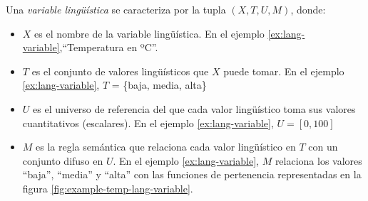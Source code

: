 \begin{definition}\label{def:formal-lang-variable}
\normalfont
Una \emph{variable lingüística} se caracteriza por la tupla $(X,T,U,M)$, donde:
\begin{itemize}
  \item $X$ es el nombre de la variable lingüística. En el ejemplo \ref{ex:lang-variable},``Temperatura en ºC''.
  \item $T$ es el conjunto de valores lingüísticos que $X$ puede tomar. En el ejemplo \ref{ex:lang-variable}, $T$ = \{baja, media, alta\}
  \item $U$ es el universo de referencia del que cada valor lingüístico toma sus valores cuantitativos (escalares). En el ejemplo \ref{ex:lang-variable}, $U = [0,100]$
  \item $M$ es la regla semántica que relaciona cada valor lingüístico en $T$ con un conjunto difuso en $U$. En el ejemplo \ref{ex:lang-variable}, $M$ relaciona los valores ``baja'', ``media'' y ``alta'' con las funciones de pertenencia representadas en la figura \ref{fig:example-temp-lang-variable}.
\end{itemize}
\end{definition}
